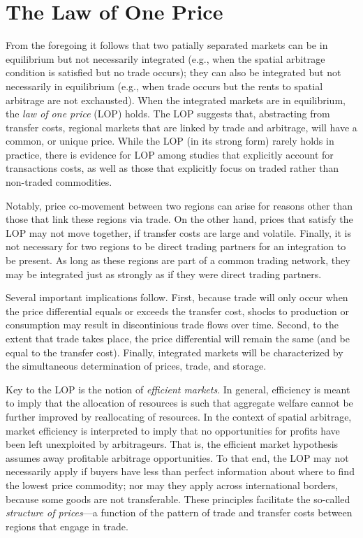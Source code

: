 \documentclass[
]{book}
\begin{document}
\hypertarget{the-law-of-one-price}{%
\section{The Law of One Price}\label{the-law-of-one-price}}

From the foregoing it follows that two patially separated markets can be in equilibrium but not necessarily integrated (e.g., when the spatial arbitrage condition is satisfied but no trade occurs); they can also be integrated but not necessarily in equilibrium (e.g., when trade occurs but the rents to spatial arbitrage are not exchausted). When the integrated markets are in equilibrium, the \emph{law of one price} (LOP) holds. The LOP suggests that, abstracting from transfer costs, regional markets that are linked by trade and arbitrage, will have a common, or unique price. While the LOP (in its strong form) rarely holds in practice, there is evidence for LOP among studies that explicitly account for transactions costs, as well as those that explicitly focus on traded rather than non-traded commodities.

Notably, price co-movement between two regions can arise for reasons other than those that link these regions via trade. On the other hand, prices that satisfy the LOP may not move together, if transfer costs are large and volatile. Finally, it is not necessary for two regions to be direct trading partners for an integration to be present. As long as these regions are part of a common trading network, they may be integrated just as strongly as if they were direct trading partners.

Several important implications follow. First, because trade will only occur when the price differential equals or exceeds the transfer cost, shocks to production or consumption may result in discontinious trade flows over time. Second, to the extent that trade takes place, the price differential will remain the same (and be equal to the transfer cost). Finally, integrated markets will be characterized by the simultaneous determination of prices, trade, and storage.

Key to the LOP is the notion of \emph{efficient markets}. In general, efficiency is meant to imply that the allocation of resources is such that aggregate welfare cannot be further improved by reallocating of resources. In the context of spatial arbitrage, market efficiency is interpreted to imply that no opportunities for profits have been left unexploited by arbitrageurs. That is, the efficient market hypothesis assumes away profitable arbitrage opportunities. To that end, the LOP may not necessarily apply if buyers have less than perfect information about where to find the lowest price commodity; nor may they apply across international borders, because some goods are not transferable. These principles facilitate the so-called \emph{structure of prices}---a function of the pattern of trade and transfer costs between regions that engage in trade.
\end{document}
